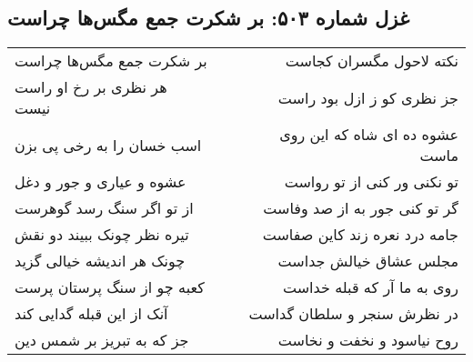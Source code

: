 \begin{center}
\section*{غزل شماره ۵۰۳: بر شکرت جمع مگس‌ها چراست}
\label{sec:0503}
\begin{longtable}{l p{0.5cm} r}
بر شکرت جمع مگس‌ها چراست
&&
نکته لاحول مگسران کجاست
\\
هر نظری بر رخ او راست نیست
&&
جز نظری کو ز ازل بود راست
\\
اسب خسان را به رخی پی بزن
&&
عشوه ده ای شاه که این روی ماست
\\
عشوه و عیاری و جور و دغل
&&
تو نکنی ور کنی از تو رواست
\\
از تو اگر سنگ رسد گوهرست
&&
گر تو کنی جور به از صد وفاست
\\
تیره نظر چونک ببیند دو نقش
&&
جامه درد نعره زند کاین صفاست
\\
چونک هر اندیشه خیالی گزید
&&
مجلس عشاق خیالش جداست
\\
کعبه چو از سنگ پرستان پرست
&&
روی به ما آر که قبله خداست
\\
آنک از این قبله گدایی کند
&&
در نظرش سنجر و سلطان گداست
\\
جز که به تبریز بر شمس دین
&&
روح نیاسود و نخفت و نخاست
\\
\end{longtable}
\end{center}
